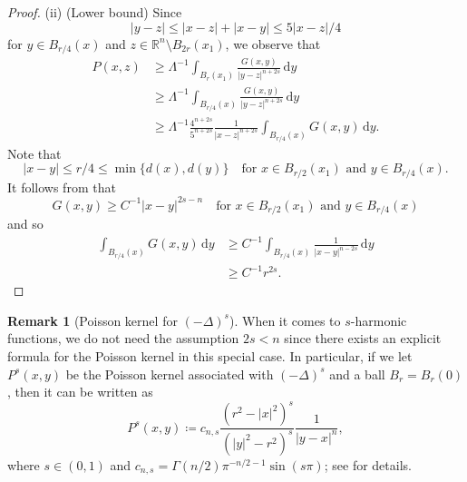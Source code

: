 \documentclass[11pt]{amsart}
\theoremstyle{plain}
\theoremstyle{definition}
\newtheorem{remark}[theorem]{Remark}
\numberwithin{equation}{section}
\begin{document}
\begin{proof}
    (ii) (Lower bound) Since
      \begin{equation*}
        |y-z| \leq |x-z|+|x-y| \leq 5|x-z|/4 
    \end{equation*}
    for $y \in B_{r/4}(x)$ and $z \in \mathbb{R}^n \setminus B_{2r}(x_1)$, we observe that
    \begin{equation*}
        \begin{aligned}
            P(x, z) &\geq \Lambda^{-1}\int_{B_r(x_1)}\frac{G(x, y)}{|y-z|^{n+2s}}\,\mathrm{d}y \\
            &\geq \Lambda^{-1}\int_{B_{r/4}(x)}\frac{G(x, y)}{|y-z|^{n+2s}}\,\mathrm{d}y\\
            &\geq \Lambda^{-1} \frac{4^{n+2s}}{5^{n+2s}}\frac{1}{|x-z|^{n+2s}} \int_{B_{r/4}(x)}G(x, y)\,\mathrm{d}y.
        \end{aligned}
    \end{equation*}
    Note that
    \begin{equation*}
        |x-y| \leq r/4 \leq \min\{d(x), d(y)\} \quad \text{for $x\in B_{r/2}(x_1)$ and $y \in B_{r/4}(x)$}.
    \end{equation*}
    It follows from  that
    \begin{equation*}
        G(x, y) \geq C^{-1}|x-y|^{2s-n} \quad \text{for $x\in B_{r/2}(x_1)$ and $y \in B_{r/4}(x)$}
    \end{equation*}
    and so 
    \begin{equation*}
        \begin{aligned}
            \int_{B_{r/4}(x)} G(x, y) \,\mathrm{d}y &\geq C^{-1}\int_{B_{r/4}(x)}\frac{1}{|x-y|^{n-2s}} \,\mathrm{d}y\\
            &\geq C^{-1}r^{2s}. 
        \end{aligned}
    \end{equation*}
    \end{proof}


    
\begin{remark}[Poisson kernel for $(-\Delta)^s$]\label{rmk-s-harmonic}
    When it comes to $s$-harmonic functions, we do not need the assumption $2s<n$ since there exists an explicit formula for the Poisson kernel in this special case. In particular, if we let $P^s(x, y)$ be the Poisson kernel associated with $(-\Delta)^s$ and a ball $B_r=B_r(0)$, then it can be written as
    \begin{equation*}
        P^s(x, y) \coloneqq
            c_{n,s} \frac{(r^2-|x|^2)^s}{(|y|^2-r^2)^s} \frac{1}{|y-x|^n},
    \end{equation*}
    where $s \in (0,1)$ and $c_{n,s}=\Gamma(n/2)\pi^{-n/2-1}\sin(s\pi)$; see \cite{BGR61, BKN02} for details. 
\end{remark}
\end{document}
